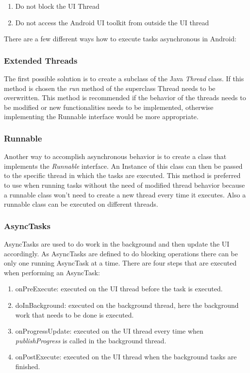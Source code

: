 \begin{enumerate}
	\item Do not block the UI Thread
	\item Do not access the Android UI toolkit from outside the UI thread
\end{enumerate}

\noindent There are a few different ways how to execute tasks asynchronous in Android:

	\subsubsection{Extended Threads}
	The first possible solution is to create a subclass of the Java \emph{Thread} class. If this method is chosen the \emph{run} method of the superclass Thread needs to be overwritten. This method is recommended if the behavior of the threads needs to be modified or new functionalities needs to be implemented, otherwise implementing the Runnable interface would be more appropriate.

	\subsubsection{Runnable}
	Another way to accomplish asynchronous behavior is to create a class that implements the \emph{Runnable} interface. An Instance of this class can then be passed to the specific thread in which the tasks are executed. This method is preferred to use when running tasks without the need of modified thread behavior because a runnable class won't need to create a new thread every time it executes. Also a runnable class can be executed on different threads.

	\subsubsection{AsyncTasks}
	AsyncTasks are used to do work in the background and then update the UI accordingly. As AsyncTasks are defined to do blocking operations there can be only one running AsyncTask at a time. There are four steps that are executed when performing an AsyncTask:

	\begin{enumerate}
		\item onPreExecute: executed on the UI thread before the task is executed.
		\item doInBackground: executed on the background thread, here the background work that needs to be done is executed.
		\item onProgressUpdate: executed on the UI thread every time when \emph{publishProgress} is called in the background thread.
		\item onPostExecute: executed on the UI thread when the background tasks are finished.
	\end{enumerate}
